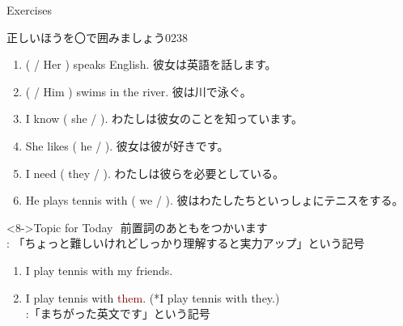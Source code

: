 \documentclass[aspectratio=169,xcolor={dvipsnames,table}]{beamer}
\begin{document}
\begin{frame}[plain]{Exercises}

{\small 正しいほうを〇で囲みましょう}\hfill{\tiny 0238}\,{\scriptsize {}}
 \begin{enumerate}
  \item (  / Her ) speaks English. {\small 彼女は英語を話します。}
  \item (   / Him ) swims in the river. {\small 彼は川で泳ぐ。}
  \item  I know ( she /   ). {\small わたしは彼女のことを知っています。}
  \item She likes ( he /   ). {\small 彼女は彼が好きです。}
  \item I need ( they /   ). {\small わたしは彼らを必要としている。}
  \item He plays tennis with ( we /   ). {\small 彼はわたしたちといっしょにテニスをする。}
 \end{enumerate}


\begin{block}<8->{Topic for Today}
\dbend\,\,前置詞のあともをつかいます\\
\hfill{\scriptsize \dbend{}: 「ちょっと難しいけれどしっかり理解すると実力アップ」という記号}
 \begin{enumerate}
  \item<9-> I play tennis with my friends.
  \item<10-> I play tennis with \textcolor{Maroon}{them}. (*I play tennis with \textcolor{NavyBlue}{they}.)\\
\hfill{\scriptsize *:「まちがった英文です」という記号}
 \end{enumerate}
     \end{block}

\end{frame}
\end{document}
